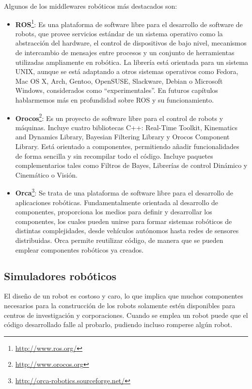 Algunos de los middlewares robóticos más destacados son:

\begin{itemize}
\item \textbf{ROS}\footnote{\url{http://www.ros.org/}}: Es una plataforma de software libre para el desarrollo de software de robots, que provee servicios estándar de un sistema operativo como la abstracción del hardware, el control de dispositivos de bajo nivel, mecanismos de intercambio de mensajes entre procesos y un conjunto de herramientas utilizadas ampliamente en robótica. La librería está orientada para un sistema UNIX, aunque se está adaptando a otros sistemas operativos como Fedora, Mac OS X, Arch, Gentoo, OpenSUSE, Slackware, Debian o Microsoft Windows, considerados como ``experimentales''.
En futuros capítulos hablarmemos más en profundidad sobre ROS y su funcionamiento.
\item \textbf{Orocos}\footnote{\url{http://www.orocos.org}}: Es un proyecto de software libre para el control de robots y máquinas. Incluye cuatro bibliotecas C++: Real-Time Toolkit, Kinematics and Dynamics Library,  Bayesian Filtering Library y  Orocos Component Library. Está orientado a componentes, permitiendo añadir funcionalidades de forma sencilla y sin recompilar todo el código.  Incluye paquetes complementarios tales como Filtros de Bayes, Librerías de control Dinámico y Cinemático o Visión.

\item \textbf{Orca}\footnote{\url{http://orca-robotics.sourceforge.net/}}: Se trata de una plataforma de software libre para el desarrollo de aplicaciones robóticas. Fundamentalmente orientada al desarrollo de componentes, proporciona los medios para definir y desarrollar los componentes, los cuales pueden unirse para formar sistemas robóticos de distintas complejidades, desde vehículos autónomos hasta redes de sensores distribuidas.
Orca permite reutilizar código, de manera que se pueden emplear componentes robóticos ya creados.
\end{itemize}

\subsection{Simuladores robóticos}
El diseño de un robot es costoso y caro, lo que implica que muchos componentes necesarios para la construcción de los robots solamente estén disponibles para centros de investigación y corporaciones. Cuando se emplea un robot puede que el código desarrollado falle al probarlo, pudiendo incluso romperse algún robot.\\

